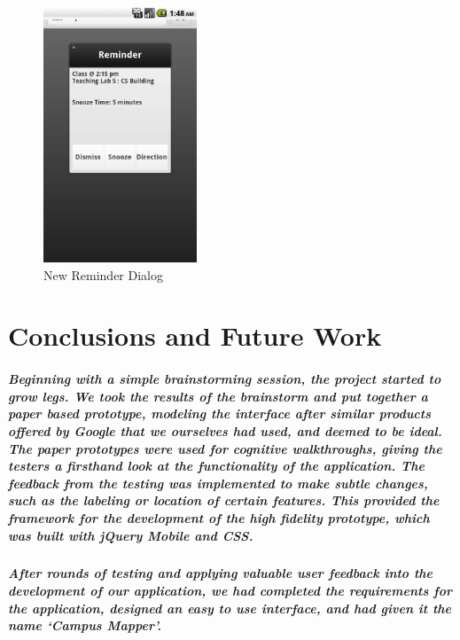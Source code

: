 \documentclass{report}
\begin{document}
    \begin{figure}
    \centering
        \includegraphics[height=3in]{img/post-dialog.png}
    \caption{New Reminder Dialog}
    \label{fig:heuristic-dialog}
    \end{figure}
\chapter{Conclusions and Future Work}
    \paragraph{Beginning with a simple brainstorming session, the project
    started to grow legs. We took the results of the brainstorm and put together a
    paper based prototype, modeling the interface after similar products offered by
    Google that we ourselves had used, and deemed to be ideal. The paper prototypes
    were used for cognitive walkthroughs, giving the testers a firsthand look at the
    functionality of the application. The feedback from the testing was implemented
    to make subtle changes, such as the labeling or location of certain features.
    This provided the framework for the development of the high fidelity prototype,
    which was built with jQuery Mobile and CSS.}
    \paragraph{After rounds of testing and applying valuable user feedback into
    the development of our application, we had completed the requirements for the
    application, designed an easy to use interface, and had given it the name
    ‘Campus Mapper’.}
\end{document}
